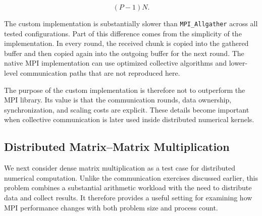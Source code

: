 $$
(P-1)N.
$$

The custom implementation is substantially slower than
\texttt{MPI\_Allgather} across all tested configurations. Part of this
difference comes from the simplicity of the implementation. In every
round, the received chunk is copied into the gathered buffer and then
copied again into the outgoing buffer for the next round. The native
MPI implementation can use optimized collective algorithms and
lower-level communication paths that are not reproduced here.

The purpose of the custom implementation is therefore not to outperform
the MPI library. Its value is that the communication rounds, data
ownership, synchronization, and scaling costs are explicit. These
details become important when collective communication is later used
inside distributed numerical kernels.



%


\subsection{Distributed Matrix--Matrix Multiplication}

We next consider dense matrix multiplication as a test case for distributed numerical computation. Unlike the communication exercises discussed earlier, this problem combines a substantial arithmetic workload with the need to distribute data and collect results. It therefore provides a useful setting for examining how MPI performance changes with both problem size and process count.

